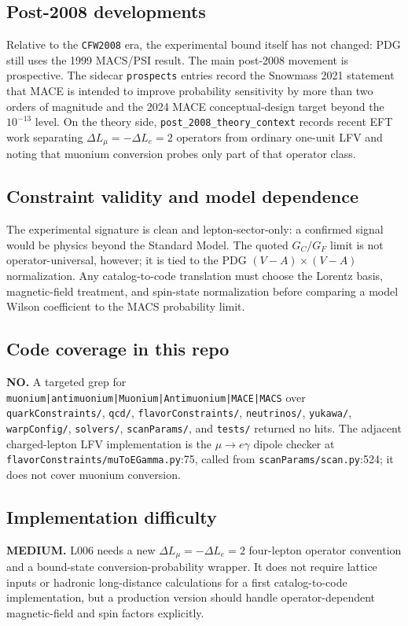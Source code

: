 \subsection*{Post-2008 developments}
Relative to the \texttt{CFW2008} era, the experimental bound itself has not
changed: PDG still uses the 1999 MACS/PSI result.  The main post-2008 movement
is prospective.  The sidecar \texttt{prospects} entries record the Snowmass
2021 statement that MACE is intended to improve probability sensitivity by
more than two orders of magnitude and the 2024 MACE conceptual-design target
beyond the \(10^{-13}\) level.  On the theory side,
\texttt{post\_2008\_theory\_context} records recent EFT work separating
\(\Delta L_\mu=-\Delta L_e=2\) operators from ordinary one-unit LFV and noting
that muonium conversion probes only part of that operator class.

\subsection*{Constraint validity and model dependence}
The experimental signature is clean and lepton-sector-only: a confirmed signal
would be physics beyond the Standard Model.  The quoted \(G_C/G_F\) limit is
not operator-universal, however; it is tied to the PDG \((V-A)\times(V-A)\)
normalization.  Any catalog-to-code translation must choose the Lorentz basis,
magnetic-field treatment, and spin-state normalization before comparing a model
Wilson coefficient to the MACS probability limit.

\subsection*{Code coverage in this repo}
\textbf{NO.}  A targeted grep for
\texttt{muonium|antimuonium|Muonium|Antimuonium|MACE|MACS} over
\texttt{quarkConstraints/}, \texttt{qcd/}, \texttt{flavorConstraints/},
\texttt{neutrinos/}, \texttt{yukawa/}, \texttt{warpConfig/}, \texttt{solvers/},
\texttt{scanParams/}, and \texttt{tests/} returned no hits.  The adjacent
charged-lepton LFV implementation is the \(\mu\to e\gamma\) dipole checker at
\texttt{flavorConstraints/muToEGamma.py}:75, called from
\texttt{scanParams/scan.py}:524; it does not cover muonium conversion.

\subsection*{Implementation difficulty}
\textbf{MEDIUM.}  L006 needs a new \(\Delta L_\mu=-\Delta L_e=2\) four-lepton
operator convention and a bound-state conversion-probability wrapper.  It does
not require lattice inputs or hadronic long-distance calculations for a first
catalog-to-code implementation, but a production version should handle
operator-dependent magnetic-field and spin factors explicitly.

